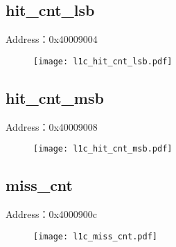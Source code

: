\subsection{hit\_cnt\_lsb}
\label{l1c-hit-cnt-lsb}
Address：0x40009004
 \begin{figure}[H]
\texttt{[image: l1c\_hit\_cnt\_lsb.pdf]}
\end{figure}

\subsection{hit\_cnt\_msb}
\label{l1c-hit-cnt-msb}
Address：0x40009008
 \begin{figure}[H]
\texttt{[image: l1c\_hit\_cnt\_msb.pdf]}
\end{figure}

\subsection{miss\_cnt}
\label{l1c-miss-cnt}
Address：0x4000900c
 \begin{figure}[H]
\texttt{[image: l1c\_miss\_cnt.pdf]}
\end{figure}

